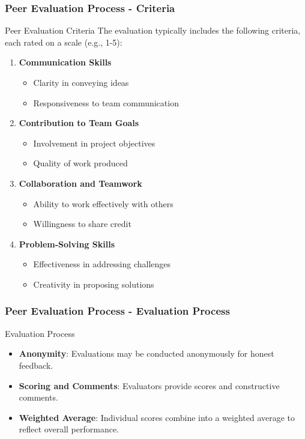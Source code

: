 \documentclass[aspectratio=169]{beamer}
\begin{document}
\begin{frame}[fragile]
    \frametitle{Peer Evaluation Process - Criteria}
    \begin{block}{Peer Evaluation Criteria}
        The evaluation typically includes the following criteria, each rated on a scale (e.g., 1-5):
        \begin{enumerate}
            \item \textbf{Communication Skills}
                \begin{itemize}
                    \item Clarity in conveying ideas
                    \item Responsiveness to team communication
                \end{itemize}
                
            \item \textbf{Contribution to Team Goals}
                \begin{itemize}
                    \item Involvement in project objectives
                    \item Quality of work produced
                \end{itemize}

            \item \textbf{Collaboration and Teamwork}
                \begin{itemize}
                    \item Ability to work effectively with others
                    \item Willingness to share credit
                \end{itemize}

            \item \textbf{Problem-Solving Skills}
                \begin{itemize}
                    \item Effectiveness in addressing challenges
                    \item Creativity in proposing solutions
                \end{itemize}
        \end{enumerate}
    \end{block}
\end{frame}

\begin{frame}[fragile]
    \frametitle{Peer Evaluation Process - Evaluation Process}
    \begin{block}{Evaluation Process}
        \begin{itemize}
            \item \textbf{Anonymity}: Evaluations may be conducted anonymously for honest feedback.
            \item \textbf{Scoring and Comments}: Evaluators provide scores and constructive comments.
            \item \textbf{Weighted Average}: Individual scores combine into a weighted average to reflect overall performance.
        \end{itemize}
    \end{block}
\end{frame}
\end{document}

